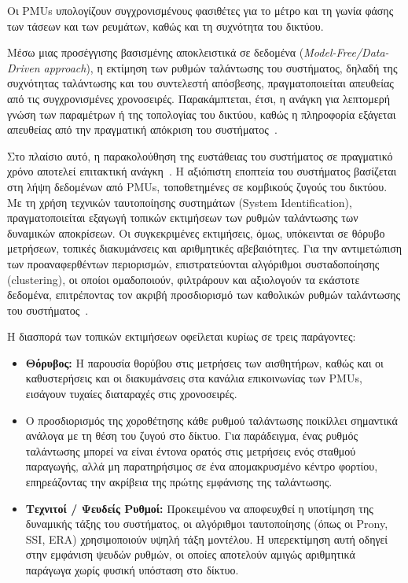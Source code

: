 Οι PMUs υπολογίζουν συγχρονισμένους φασιθέτες για το μέτρο και τη γωνία φάσης των τάσεων και των ρευμάτων, καθώς και τη συχνότητα του δικτύου.

Μέσω μιας προσέγγισης βασισμένης αποκλειστικά σε δεδομένα (\textenglish{\textit{Model-Free/Data-Driven approach}}), η εκτίμηση των ρυθμών ταλάντωσης του συστήματος, δηλαδή της συχνότητας ταλάντωσης και του συντελεστή απόσβεσης, πραγματοποιείται απευθείας από τις συγχρονισμένες χρονοσειρές. Παρακάμπτεται, έτσι, η ανάγκη για λεπτομερή γνώση των παραμέτρων ή της τοπολογίας του δικτύου, καθώς η πληροφορία εξάγεται απευθείας από την πραγματική απόκριση του συστήματος~\cite{modal2018,estimation2021}.

Στο πλαίσιο αυτό, η παρακολούθηση της ευστάθειας του συστήματος σε πραγματικό χρόνο αποτελεί επιτακτική ανάγκη~\cite{kundur1994,zeng2020inertia}.
Η αξιόπιστη εποπτεία του συστήματος βασίζεται στη λήψη δεδομένων από PMUs, τοποθετημένες σε κομβικούς ζυγούς του δικτύου. Με τη χρήση τεχνικών ταυτοποίησης συστημάτων (\textenglish{System Identification}), πραγματοποιείται εξαγωγή τοπικών εκτιμήσεων των ρυθμών ταλάντωσης των δυναμικών αποκρίσεων. Οι συγκεκριμένες εκτιμήσεις, όμως, υπόκεινται σε θόρυβο μετρήσεων, τοπικές διακυμάνσεις και αριθμητικές αβεβαιότητες. Για την αντιμετώπιση των προαναφερθέντων περιορισμών, επιστρατεύονται αλγόριθμοι συσταδοποίησης (\textenglish{clustering}), οι οποίοι ομαδοποιούν, φιλτράρουν και  αξιολογούν τα εκάστοτε δεδομένα, επιτρέποντας τον ακριβή προσδιορισμό των καθολικών ρυθμών ταλάντωσης του συστήματος~\cite{estimation2021,schumacher2022clusteredr3ls}.

Η διασπορά των τοπικών εκτιμήσεων οφείλεται κυρίως σε τρεις παράγοντες:

\begin{itemize}
    \item \textbf{Θόρυβος:} Η παρουσία θορύβου στις μετρήσεις των αισθητήρων, καθώς και οι καθυστερήσεις και οι διακυμάνσεις στα κανάλια επικοινωνίας των PMUs, εισάγουν τυχαίες διαταραχές στις χρονοσειρές.

    \item Ο προσδιορισμός της χοροθέτησης κάθε ρυθμού ταλάντωσης ποικίλλει σημαντικά ανάλογα με τη θέση του ζυγού στο δίκτυο. Για παράδειγμα, ένας ρυθμός ταλάντωσης μπορεί να είναι έντονα ορατός στις μετρήσεις ενός σταθμού παραγωγής, αλλά μη παρατηρήσιμος σε ένα απομακρυσμένο κέντρο φορτίου, επηρεάζοντας την ακρίβεια της πρώτης εμφάνισης της ταλάντωσης.

    \item \textbf{Τεχνιτοί / Ψευδείς Ρυθμοί:} Προκειμένου να αποφευχθεί η υποτίμηση της δυναμικής τάξης του συστήματος, οι αλγόριθμοι ταυτοποίησης (όπως οι Prony, SSI, ERA) χρησιμοποιούν υψηλή τάξη μοντέλου. Η υπερεκτίμηση αυτή οδηγεί στην εμφάνιση ψευδών ρυθμών, οι οποίες αποτελούν αμιγώς αριθμητικά παράγωγα χωρίς φυσική υπόσταση στο δίκτυο.
\end{itemize}

